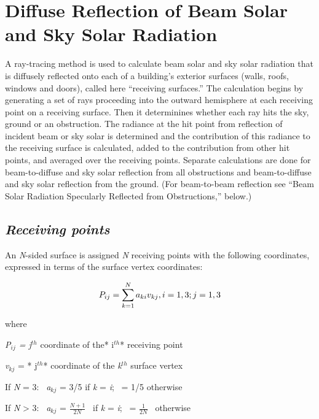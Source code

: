\section{Diffuse Reflection of Beam Solar and Sky Solar Radiation}\label{diffuse-reflection-of-beam-solar-and-sky-solar-radiation}

A ray-tracing method is used to calculate beam solar and sky solar radiation that is diffusely reflected onto each of a building's exterior surfaces (walls, roofs, windows and doors), called here ``receiving surfaces.'' The calculation begins by generating a set of rays proceeding into the outward hemisphere at each receiving point on a receiving surface. Then it determinines whether each ray hits the sky, ground or an obstruction. The radiance at the hit point from reflection of incident beam or sky solar is determined and the contribution of this radiance to the receiving surface is calculated, added to the contribution from other hit points, and averaged over the receiving points. Separate calculations are done for beam-to-diffuse and sky solar reflection from all obstructions and beam-to-diffuse and sky solar reflection from the ground. (For beam-to-beam reflection see ``Beam Solar Radiation Specularly Reflected from Obstructions,'' below.)

\subsection{\emph{Receiving points}}\label{receiving-points}

An \emph{N}-sided surface is assigned \emph{N} receiving points with the following coordinates, expressed in terms of the surface vertex coordinates:

\begin{equation}
{P_{ij}} = \sum\limits_{k = 1}^N {{a_{ki}}{v_{kj}},{\rm{  }}i = 1,3;{\rm{  }}j = 1,3}
\end{equation}

where

\emph{P\(_{ij}\) = j\(^{th}\)} coordinate of the* i\(^{th}\)* receiving point

\emph{v\(_{kj}\)} = * j\(^{th}\)* coordinate of the \emph{k\(^{th}\)} surface vertex

If \emph{N} = 3:~ \emph{a\(_{kj}\)} = 3/5 if \emph{k} = \emph{i};~ = 1/5 otherwise

If \emph{N} \textgreater{} 3:~ \emph{a\(_{kj}\)} = \(\frac{{N + 1}}{{2N}}\) ~if \emph{k} = \emph{i};~ = \(\frac{1}{{2N}}\) ~otherwise


